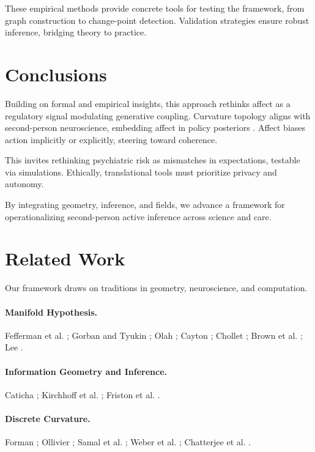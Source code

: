 \documentclass{article}
\theoremstyle{definition}
\begin{document}
These empirical methods provide concrete tools for testing the framework, from graph construction to change-point detection. Validation strategies ensure robust inference, bridging theory to practice.

\section{Conclusions}

Building on formal and empirical insights, this approach rethinks affect as a regulatory signal modulating generative coupling. Curvature topology aligns with second-person neuroscience, embedding affect in policy posteriors \cite{dacosta2020planning}. Affect biases action implicitly or explicitly, steering toward coherence.

This invites rethinking psychiatric risk as mismatches in expectations, testable via simulations. Ethically, translational tools must prioritize privacy and autonomy.

By integrating geometry, inference, and fields, we advance a framework for operationalizing second-person active inference across science and care.

\section{Related Work}

Our framework draws on traditions in geometry, neuroscience, and computation.

\paragraph{Manifold Hypothesis.} Fefferman et al. \cite{fefferman2016testing}; Gorban and Tyukin \cite{gorban2018blessing}; Olah \cite{olah2014blog}; Cayton \cite{cayton2005algorithms}; Chollet \cite{chollet2021deep}; Brown et al. \cite{brown2023union}; Lee \cite{lee2023geometric}.

\paragraph{Information Geometry and Inference.} Caticha \cite{caticha2015geometry}; Kirchhoff et al. \cite{kirchhoff2018markov}; Friston et al. \cite{friston2017graphical}.

\paragraph{Discrete Curvature.} Forman \cite{forman2003bochner}; Ollivier \cite{ollivier2009ricci}; Samal et al. \cite{samal2018comparative}; Weber et al. \cite{weber2019curvature}; Chatterjee et al. \cite{chatterjee2021detecting}.
\end{document}
